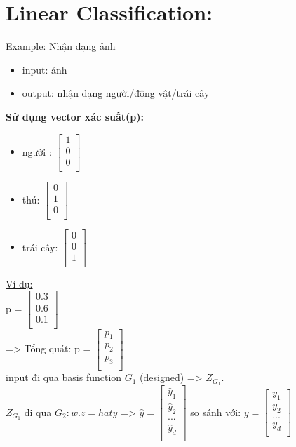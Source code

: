 \documentclass{article}
\begin{document}
\section{Linear Classification:}
Example: Nhận dạng ảnh
\begin{itemize}
    \item input: ảnh
    \item output: nhận dạng người/động vật/trái cây \\
\end{itemize}
\textbf{Sử dụng vector xác suất(p):}
\begin{itemize}
    \item người : $\begin{bmatrix}
     1\\ 
     0\\
     0\\
     \end{bmatrix}$
     \item thú:  $\begin{bmatrix}
     0\\ 
     1\\
     0\\
     \end{bmatrix}$
     \item trái cây: $\begin{bmatrix}
     0\\ 
     0\\
     1\\
     \end{bmatrix}$
\end{itemize}
\underline{Ví dụ:} \\
p = $\begin{bmatrix}
     0.3\\ 
     0.6\\
     0.1\\
     \end{bmatrix}$ \\
=> Tổng quát: p = $\begin{bmatrix}
     p_1\\ 
     p_2\\
     p_3\\
     \end{bmatrix}$ \\ 
input đi qua basis function $G_1$ (designed) => $Z_{G_1}$.\\
$Z_{G_1}$ đi qua $G_2: w.z=hat{y}$ =>
$\hat{y} =
    \begin{bmatrix}
     \hat{y}_{1}\\ 
     \hat{y}_{2}\\
     ...\\
     \hat{y}_{d}\\
     \end{bmatrix}$
so sánh với: 
$y = \begin{bmatrix}
     y_{1}\\ 
     y_{2}\\
     ...\\
     y_{d}\\
     \end{bmatrix}$\\
\end{document}

